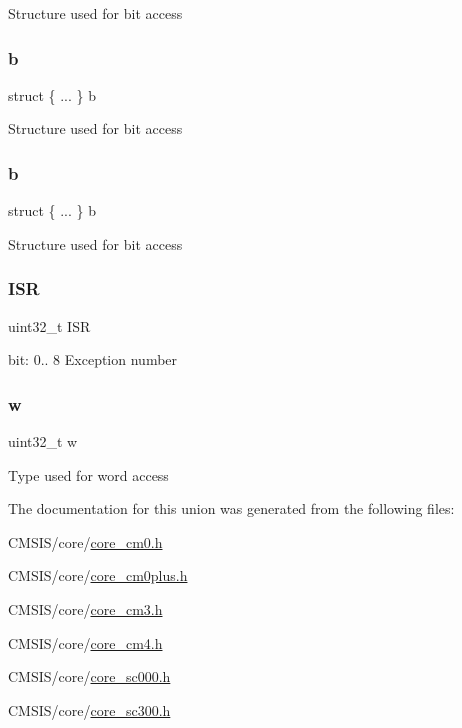 Structure used for bit access \mbox{\label{union_i_p_s_r___type_a7f652697aca4eb51fd5a75cd894a13c7}} 
\subsubsection{\texorpdfstring{b}{b}\hspace{0.1cm}{\footnotesize\ttfamily [5/6]}}
{\footnotesize\ttfamily struct \{ ... \}   b}

Structure used for bit access \mbox{\label{union_i_p_s_r___type_a9da38bc566a366ab30cb221935ab2c46}} 
\subsubsection{\texorpdfstring{b}{b}\hspace{0.1cm}{\footnotesize\ttfamily [6/6]}}
{\footnotesize\ttfamily struct \{ ... \}   b}

Structure used for bit access \mbox{\label{union_i_p_s_r___type_ad502ba7dbb2aab5f87c782b28f02622d}} 
\subsubsection{\texorpdfstring{ISR}{ISR}}
{\footnotesize\ttfamily uint32\+\_\+t I\+SR}

bit\+: 0.. 8 Exception number \mbox{\label{union_i_p_s_r___type_ad0fb62e7a08e70fc5e0a76b67809f84b}} 
\subsubsection{\texorpdfstring{w}{w}}
{\footnotesize\ttfamily uint32\+\_\+t w}

Type used for word access 

The documentation for this union was generated from the following files\+:\begin{DoxyCompactItemize}
\item 
C\+M\+S\+I\+S/core/\mbox{\hyperlink{core__cm0_8h}{core\+\_\+cm0.\+h}}\item 
C\+M\+S\+I\+S/core/\mbox{\hyperlink{core__cm0plus_8h}{core\+\_\+cm0plus.\+h}}\item 
C\+M\+S\+I\+S/core/\mbox{\hyperlink{core__cm3_8h}{core\+\_\+cm3.\+h}}\item 
C\+M\+S\+I\+S/core/\mbox{\hyperlink{core__cm4_8h}{core\+\_\+cm4.\+h}}\item 
C\+M\+S\+I\+S/core/\mbox{\hyperlink{core__sc000_8h}{core\+\_\+sc000.\+h}}\item 
C\+M\+S\+I\+S/core/\mbox{\hyperlink{core__sc300_8h}{core\+\_\+sc300.\+h}}\end{DoxyCompactItemize}
